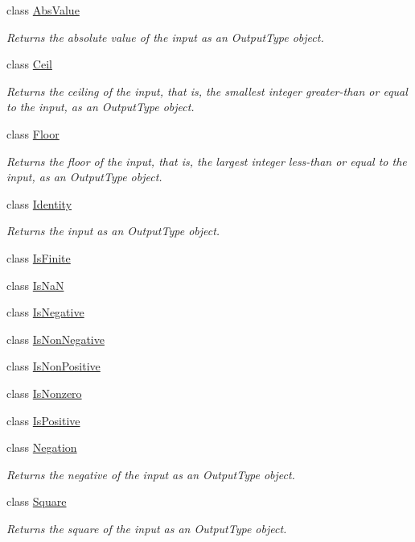 \begin{DoxyCompactItemize}
\item 
class \hyperlink{classvct_unary_operations_1_1_abs_value}{Abs\+Value}
\begin{DoxyCompactList}\small\item\em Returns the absolute value of the input as an Output\+Type object. \end{DoxyCompactList}\item 
class \hyperlink{classvct_unary_operations_1_1_ceil}{Ceil}
\begin{DoxyCompactList}\small\item\em Returns the ceiling of the input, that is, the smallest integer greater-\/than or equal to the input, as an Output\+Type object. \end{DoxyCompactList}\item 
class \hyperlink{classvct_unary_operations_1_1_floor}{Floor}
\begin{DoxyCompactList}\small\item\em Returns the floor of the input, that is, the largest integer less-\/than or equal to the input, as an Output\+Type object. \end{DoxyCompactList}\item 
class \hyperlink{classvct_unary_operations_1_1_identity}{Identity}
\begin{DoxyCompactList}\small\item\em Returns the input as an Output\+Type object. \end{DoxyCompactList}\item 
class \hyperlink{classvct_unary_operations_1_1_is_finite}{Is\+Finite}
\item 
class \hyperlink{classvct_unary_operations_1_1_is_na_n}{Is\+Na\+N}
\item 
class \hyperlink{classvct_unary_operations_1_1_is_negative}{Is\+Negative}
\item 
class \hyperlink{classvct_unary_operations_1_1_is_non_negative}{Is\+Non\+Negative}
\item 
class \hyperlink{classvct_unary_operations_1_1_is_non_positive}{Is\+Non\+Positive}
\item 
class \hyperlink{classvct_unary_operations_1_1_is_nonzero}{Is\+Nonzero}
\item 
class \hyperlink{classvct_unary_operations_1_1_is_positive}{Is\+Positive}
\item 
class \hyperlink{classvct_unary_operations_1_1_negation}{Negation}
\begin{DoxyCompactList}\small\item\em Returns the negative of the input as an Output\+Type object. \end{DoxyCompactList}\item 
class \hyperlink{classvct_unary_operations_1_1_square}{Square}
\begin{DoxyCompactList}\small\item\em Returns the square of the input as an Output\+Type object. \end{DoxyCompactList}\end{DoxyCompactItemize}
